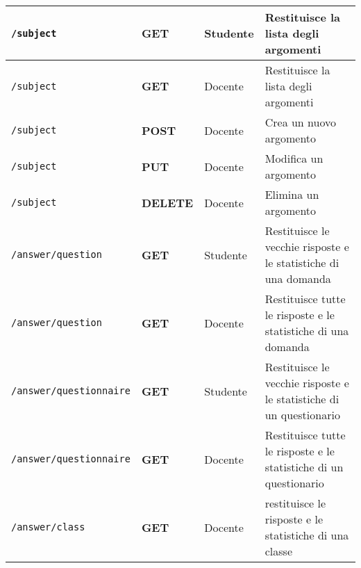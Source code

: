 \documentclass[12pt,a4paper]{article}
\begin{document}
\begin{center}
\begin{longtable}[H]{p{} p{} p{} p{}}
		\midrule
		\midrule
		\texttt{/subject} & \textbf{GET} & Studente & Restituisce la lista degli argomenti \\*
		\midrule
		\texttt{/subject} & \textbf{GET} & Docente & Restituisce la lista degli argomenti \\*
		\midrule
		\texttt{/subject} & \textbf{POST} & Docente & Crea un nuovo argomento \\*
		\midrule
		\texttt{/subject} & \textbf{PUT} & Docente & Modifica un argomento \\*
		\midrule
		\texttt{/subject} & \textbf{DELETE} & Docente & Elimina un argomento \\*
		
		
		\midrule
		\midrule
		\texttt{/answer/question} & \textbf{GET} & Studente & Restituisce le vecchie risposte e le statistiche di una domanda \\*
		\midrule
		\texttt{/answer/question} & \textbf{GET} & Docente & Restituisce tutte le risposte e le statistiche di una domanda \\*
		\midrule
		\texttt{/answer/questionnaire} & \textbf{GET} & Studente & Restituisce le vecchie risposte e le statistiche di un questionario \\*
		\midrule
		\texttt{/answer/questionnaire} & \textbf{GET} & Docente & Restituisce tutte le risposte e le statistiche di un questionario \\*
		\midrule
		\texttt{/answer/class} & \textbf{GET} & Docente & restituisce le risposte e le statistiche di una classe \\*
		

\end{longtable}
\end{center}
\end{document}
